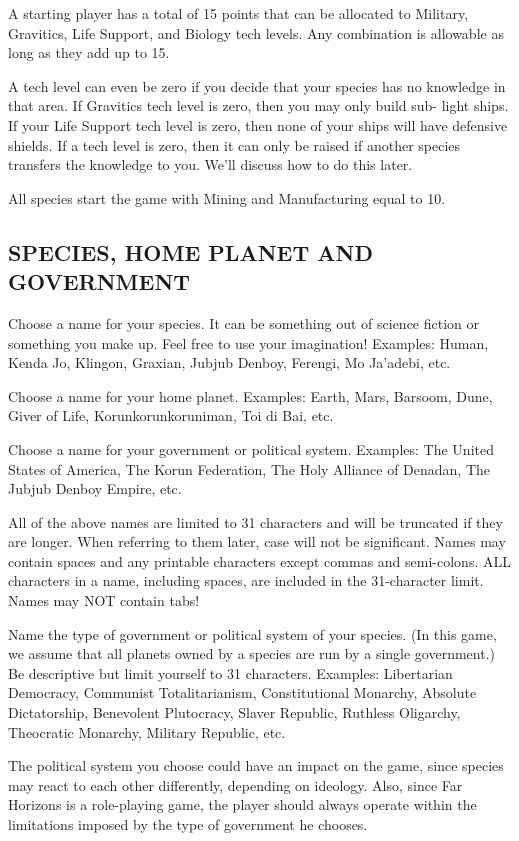 \documentclass[10pt,titlepage]{article}
\begin{document}
A starting player has a total of 15 points that can be allocated to Military,
Gravitics, Life Support, and Biology tech levels.  Any combination is allowable
as long as they add up to 15.

A tech level can even be zero if you decide that your species has no knowledge
in that area.  If Gravitics tech level is zero, then you may only build sub-
light ships.  If your Life Support tech level is zero, then none of your ships
will have defensive shields.  If a tech level is zero, then it can only be
raised if another species transfers the knowledge to you.  We'll discuss how
to do this later.

All species start the game with Mining and Manufacturing equal to 10.


\subsection{SPECIES, HOME PLANET AND GOVERNMENT}

Choose a name for your species.  It can be something out of science fiction or
something you make up.  Feel free to use your imagination!  Examples: Human,
Kenda Jo, Klingon, Graxian, Jubjub Denboy, Ferengi, Mo Ja'adebi, etc.

Choose a name for your home planet.  Examples: Earth, Mars, Barsoom, Dune,
Giver of Life, Korunkorunkoruniman, Toi di Bai, etc.

Choose a name for your government or political system.  Examples: The United
States of America, The Korun Federation, The Holy Alliance of Denadan, The
Jubjub Denboy Empire, etc.

All of the above names are limited to 31 characters and will be truncated if
they are longer.  When referring to them later, case will not be significant.
Names may contain spaces and any printable characters except commas and
semi-colons.  ALL characters in a name, including spaces, are included
in the 31-character limit.  Names may NOT contain tabs!

Name the type of government or political system of your species.  (In this
game, we assume that all planets owned by a species are run by a single
government.)  Be descriptive but limit yourself to 31 characters.  Examples:
Libertarian Democracy, Communist Totalitarianism, Constitutional Monarchy,
Absolute Dictatorship, Benevolent Plutocracy, Slaver Republic, Ruthless
Oligarchy, Theocratic Monarchy, Military Republic, etc.

The political system you choose could have an impact on the game, since species
may react to each other differently, depending on ideology.  Also, since Far
Horizons is a role-playing game, the player should always operate within the
limitations imposed by the type of government he chooses.
\end{document}
